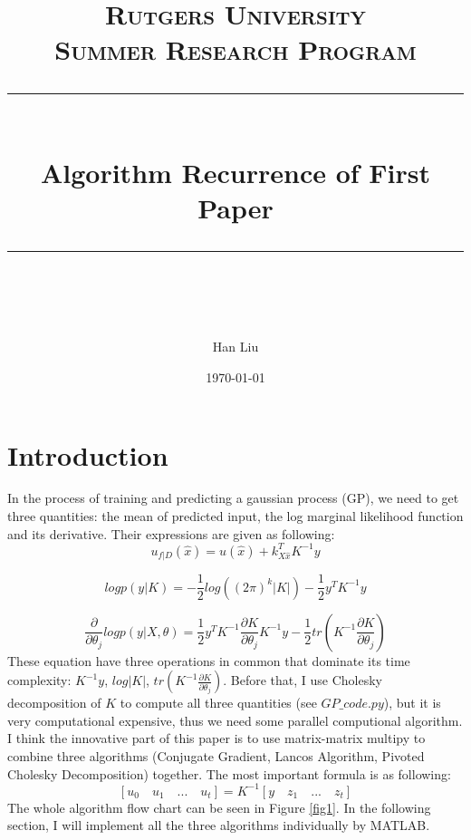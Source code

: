 \documentclass{article} %
\title{
\normalfont \normalsize 
\textsc{Rutgers University \\ 
Summer Research Program} \\
[10pt] 
\rule{\linewidth}{0.5pt} \\[6pt] 
\huge Algorithm Recurrence of First Paper  \\
\rule{\linewidth}{2pt}  \\[10pt]
}
\author{Han Liu}
\date{\normalsize \today}
\begin{document}
\maketitle



\section{Introduction}
In the process of training and predicting a gaussian process (GP), we need to get three quantities: the mean of predicted input, the log marginal likelihood function and its derivative. Their expressions are given as following:
\begin{equation}
u_{f|D}(\hat{x})=u(\hat{x})+k_{X\hat{x}}^{T}K^{-1}y
\end{equation}

\begin{equation}\label{eq1}
logp({y|K})=-\frac{1}{2}log((2\pi)^k|K|)-\frac{1}{2}y^T{K}^{-1}y
\end{equation}

\begin{equation}
\frac{\partial}{\partial \theta_j}logp(y|X,\theta)=\frac{1}{2}y^{T}K^{-1}\frac{\partial K}{\partial \theta_j}K^{-1}y-\frac{1}{2}tr(K^{-1}\frac{\partial K}{\partial \theta_j})
\end{equation}
These equation have three operations in common that dominate its time complexity: $K^{-1}y$, $log|K|$, $tr(K^{-1}\frac{\partial K}{\partial \theta_j})$. Before that, I use Cholesky decomposition of $K$ to compute all three quantities (see $GP\_code.py$), but it is very computational expensive, thus we need some parallel computional algorithm.\\
I think the innovative part of this paper is to use matrix-matrix multipy to combine three algorithms (Conjugate Gradient, Lancos Algorithm, Pivoted Cholesky Decomposition) together. The most important formula is as following:
\begin{equation}\label{equ1}
[u_0 \quad u_1 \quad ... \quad u_t]=K^{-1}[y \quad z_1 \quad ... \quad z_t]
\end{equation}
The whole algorithm flow chart can be seen in Figure \ref{fig1}. In the following section, I will implement all the three algorithms individually by MATLAB.
\end{document}
